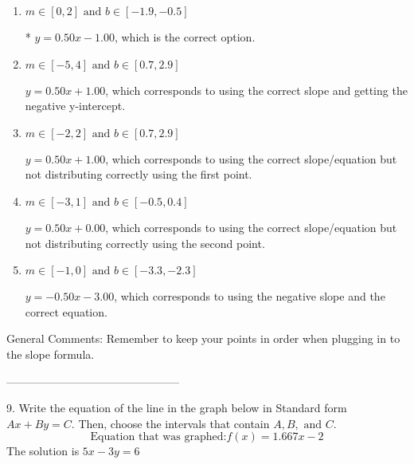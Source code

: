 \documentclass{article}[14pt]
\begin{document}
\begin{enumerate}[label=\Alph*.] 
\item $ m \in [0, 2] \text{ and } b \in [-1.9, -0.5] $ 

 * $y = 0.50x - 1.00$, which is the correct option. 
\item $ m \in [-5, 4] \text{ and } b \in [0.7, 2.9] $ 

  $y = 0.50x + 1.00$, which corresponds to using the correct slope and getting the negative y-intercept. 
\item $ m \in [-2, 2] \text{ and } b \in [0.7, 2.9] $ 

  $y = 0.50x + 1.00$, which corresponds to using the correct slope/equation but not distributing correctly using the first point. 
\item $ m \in [-3, 1] \text{ and } b \in [-0.5, 0.4] $ 

  $y = 0.50x + 0.00$, which corresponds to using the correct slope/equation but not distributing correctly using the second point. 
\item $ m \in [-1, 0] \text{ and } b \in [-3.3, -2.3] $ 

  $y = -0.50x - 3.00$, which corresponds to using the negative slope and the correct equation. 
\end{enumerate} 
 
General Comments: Remember to keep your points in order when plugging in to the slope formula.

-----------------------------------------------

9. Write the equation of the line in the graph below in Standard form $Ax+By=C$. Then, choose the intervals that contain $A, B, \text{ and } C$.
$$ \text{Equation that was graphed:} f(x)= 1.667 x - 2 $$ 
The solution is $ 5 x - 3 y = 6 $ 
\end{document}
